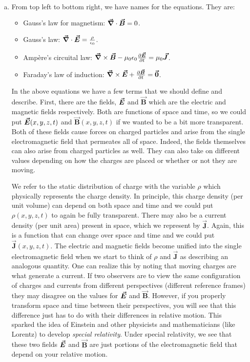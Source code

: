 \documentclass[12pt]{article} %
\newcommand{\vecfieldB}{\boldsymbol{\vec{B}}}
\newcommand{\vecfieldJ}{\boldsymbol{\vec{J}}}
\begin{document}
\begin{solution}~
\begin{enumerate}[(a)]
    \item From top left to bottom right, we have names for the equations.  They are:
    \begin{itemize}
        \item Gauss's law for magnetism: $\grad \cdot \vecfieldB = 0$.
        \item Gauss's law: $\boldsymbol{\vec{\nabla}} \cdot \boldsymbol{\vec{E}} = \frac{\rho}{\epsilon_0}$.
        \item Amp\`ere's circuital law: $\grad \times \vecfieldB -\mu_0 \epsilon_0\frac{\partial \vecfieldE}{\partial t}=\mu_0 \vecfieldJ$.
        \item Faraday's law of induction: $\grad \times \vecfieldE + \frac{\partial \vecfieldB}{\partial t} = \zerovec$.
    \end{itemize}
    
    In the above equations we have a few terms that we should define and describe.  First, there are the fields, $\boldsymbol{\vec{E}}$ and $\vecfieldB$ which are the electric and magnetic fields respectively.  Both are functions of space and time, so we could put $\boldsymbol{\vec{E}}(x,y,z,t)$ and $\vecfieldB(x,y,z,t)$ if we wanted to be a bit more transparent.  Both of these fields cause forces on charged particles and arise from the single electromagnetic field that permeates all of space.  Indeed, the fields themselves can also arise from charged particles as well.  They can also take on different values depending on how the charges are placed or whether or not they are moving.
    
    We refer to the static distribution of charge with the variable $\rho$ which physically represents the charge density.  In principle, this charge density (per unit volume) can depend on both space and time and we could put $\rho(x,y,z,t)$ to again be fully transparent.  There may also be a current density (per unit area) present in space, which we represent by $\vecfieldJ$. Again, this is a function that can change over space and time and we could put $\vecfieldJ(x,y,z,t)$.  The electric and magnetic fields become unified into the single electromagnetic field when we start to think of $\rho$ and $\vecfieldJ$ as describing an analogous quantity. One can realize this by noting that moving charges are what generate a current.  If two observers are to view the same configuration of charges and currents from different perspectives (different reference frames) they may disagree on the values for $\boldsymbol{\vec{E}}$ and $\vecfieldB$.  However, if you properly transform space and time between their perspectives, you will see that this difference just has to do with their differences in relative motion.  This sparked the idea of Einstein and other physicists and mathematicians (like Lorentz) to develop \emph{special relativity}.  Under special relativity, we see that these two fields $\boldsymbol{\vec{E}}$ and $\vecfieldB$ are just portions of the electromagnetic field that depend on your relative motion.
    

\end{enumerate}
\end{solution}
\end{document}
